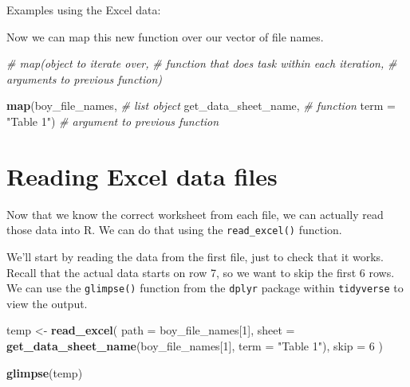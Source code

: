 \documentclass[]{book}
\newenvironment{Shaded}{\begin{snugshade}}{\end{snugshade}}
\newcommand{\KeywordTok}[1]{\textcolor[rgb]{0.13,0.29,0.53}{\textbf{#1}}}
\newcommand{\DataTypeTok}[1]{\textcolor[rgb]{0.13,0.29,0.53}{#1}}
\newcommand{\DecValTok}[1]{\textcolor[rgb]{0.00,0.00,0.81}{#1}}
\newcommand{\StringTok}[1]{\textcolor[rgb]{0.31,0.60,0.02}{#1}}
\newcommand{\CommentTok}[1]{\textcolor[rgb]{0.56,0.35,0.01}{\textit{#1}}}
\newcommand{\ControlFlowTok}[1]{\textcolor[rgb]{0.13,0.29,0.53}{\textbf{#1}}}
\newcommand{\OperatorTok}[1]{\textcolor[rgb]{0.81,0.36,0.00}{\textbf{#1}}}
\newcommand{\NormalTok}[1]{#1}
\begin{document}
Examples using the Excel data:

\begin{Shaded}
\end{Shaded}

Now we can map this new function over our vector of file names.

\begin{Shaded}
\begin{Highlighting}[]
\CommentTok{# map(object to iterate over, }
\CommentTok{#     function that does task within each iteration, }
\CommentTok{#     arguments to previous function)}
 
\KeywordTok{map}\NormalTok{(boy_file_names,      }\CommentTok{# list object}
\NormalTok{    get_data_sheet_name, }\CommentTok{# function}
    \DataTypeTok{term =} \StringTok{"Table 1"}\NormalTok{)    }\CommentTok{# argument to previous function}
\end{Highlighting}
\end{Shaded}

\section{Reading Excel data files}\label{reading-excel-data-files}

Now that we know the correct worksheet from each file, we can actually
read those data into R. We can do that using the \texttt{read\_excel()}
function.

We'll start by reading the data from the first file, just to check that
it works. Recall that the actual data starts on row 7, so we want to
skip the first 6 rows. We can use the \texttt{glimpse()} function from
the \texttt{dplyr} package within \texttt{tidyverse} to view the output.

\begin{Shaded}
\begin{Highlighting}[]
\NormalTok{temp <-}\StringTok{ }\KeywordTok{read_excel}\NormalTok{(}
  \DataTypeTok{path =}\NormalTok{ boy_file_names[}\DecValTok{1}\NormalTok{],}
  \DataTypeTok{sheet =} \KeywordTok{get_data_sheet_name}\NormalTok{(boy_file_names[}\DecValTok{1}\NormalTok{], }\DataTypeTok{term =} \StringTok{"Table 1"}\NormalTok{),}
  \DataTypeTok{skip =} \DecValTok{6}
\NormalTok{)}

\KeywordTok{glimpse}\NormalTok{(temp)}
\end{Highlighting}
\end{Shaded}
\end{document}
